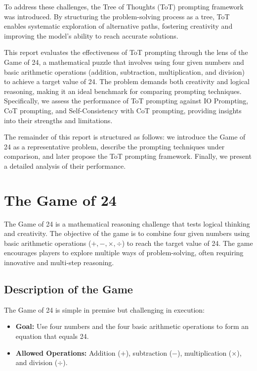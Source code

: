 \documentclass[12pt, a4paper]{article}
\begin{document}
To address these challenges, the Tree of Thoughts (ToT) prompting framework~\cite{TOT} was introduced. By structuring the problem-solving process as a tree, ToT enables systematic exploration of alternative paths, fostering creativity and improving the model’s ability to reach accurate solutions.

This report evaluates the effectiveness of ToT prompting through the lens of the Game of 24, a mathematical puzzle that involves using four given numbers and basic arithmetic operations (addition, subtraction, multiplication, and division) to achieve a target value of 24. The problem demands both creativity and logical reasoning, making it an ideal benchmark for comparing prompting techniques. Specifically, we assess the performance of ToT prompting against IO Prompting, CoT prompting, and Self-Consistency with CoT prompting, providing insights into their strengths and limitations.

The remainder of this report is structured as follows: we introduce the Game of 24 as a representative problem, describe the prompting techniques under comparison, and later propose the ToT prompting framework. Finally, we present a detailed analysis of their performance.

\section{The Game of 24}

The Game of 24 is a mathematical reasoning challenge that tests logical thinking and creativity. The objective of the game is to combine four given numbers using basic arithmetic operations (\(+, -, \times, \div\)) to reach the target value of 24. The game encourages players to explore multiple ways of problem-solving, often requiring innovative and multi-step reasoning.

\subsection{Description of the Game}

The Game of 24 is simple in premise but challenging in execution:

\begin{itemize}
    \item \textbf{Goal:} Use four numbers and the four basic arithmetic operations to form an equation that equals 24.
    \item \textbf{Allowed Operations:} Addition (\(+\)), subtraction (\(-\)), multiplication (\(\times\)), and division (\(\div\)).
\end{itemize}
\end{document}
